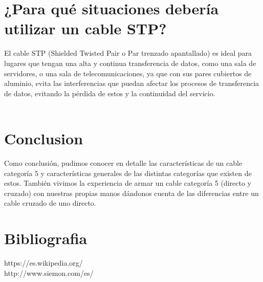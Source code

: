 \documentclass{article}
\begin{document}
\section{¿Para qué situaciones debería utilizar un cable STP?}
El cable STP (Shielded Twisted Pair o Par trenzado apantallado) es ideal para lugares que tengan una alta y continua transferencia de datos, como una sala de servidores, o una sala de telecomunicaciones,  ya que con sus pares cubiertos de aluminio, evita las interferencias que puedan afectar los procesos de transferencia de datos, evitando la pérdida de estos y la continuidad del servicio. \\\\

\section{Conclusion}
Como conclusión, pudimos conocer en detalle las características de un cable categoría 5 y características generales de las distintas categorías que existen de estos. También vivimos la experiencia de armar un cable categoría 5 (directo y cruzado) con nuestras propias manos dándonos cuenta de las diferencias entre un cable cruzado de uno directo.

\section{Bibliografia}
https://es.wikipedia.org/\\
http://www.siemon.com/es/
\end{document}
